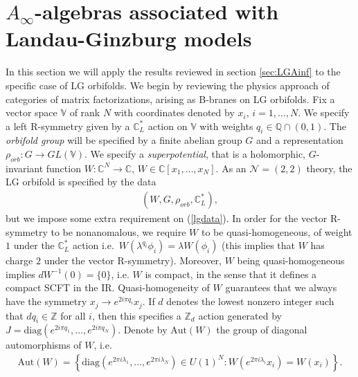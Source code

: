 \documentclass[a4paper,11pt]{article}
\newcommand{\Af}{{A_\infty}}
\numberwithin{equation}{section}
\begin{document}
\section{$\Af$-algebras associated with Landau-Ginzburg 
models}\label{sec:AinfLG}

In this section we will apply the results reviewed in section \ref{sec:LGAinf} 
to the specific case of LG orbifolds. We begin by reviewing the physics 
approach of categories of matrix factorizations, arising as B-branes on LG 
orbifolds. Fix a vector 
space $\mathbb{V}$ of rank $N$ with coordinates denoted by $x_{i}$, 
$i=1,\ldots,N$. We specify a left R-symmetry given by a $\mathbb{C}^{*}_{L}$ 
action on $\mathbb{V}$ with weights $q_{i}\in\mathbb{Q}\cap (0,1)$. The 
\emph{orbifold group} will be specified by a finite abelian group $G$ and a 
representation $\rho_{orb}:G\rightarrow GL(\mathbb{V})$. We specify a 
\emph{superpotential}, that is a holomorphic, $G$-invariant function 
$W:\mathbb{C}^{N}\rightarrow \mathbb{C}$, $W\in 
\mathbb{C}[x_{1},\ldots,x_{N}]$. As an $\mathcal{N}=(2,2)$ theory, the 
LG orbifold is specified by the data
\begin{eqnarray}
  \label{lgdata}
(W,G,\rho_{orb},\mathbb{C}^{*}_{L}),
\end{eqnarray}
but we impose some extra requirement on (\ref{lgdata}). In order for 
the vector R-symmetry to be nonanomalous, we require $W$ to 
be quasi-homogeneous, of weight $1$ under the $\mathbb{C}^{*}_{L}$ action
i.e.~$W(\lambda^{q_{i}}\phi_{i})=\lambda W(\phi_{i})$ \cite{Vafa:1988uu} (this 
implies that $W$ has charge $2$ under the vector R-symmetry). Moreover, $W$ 
being quasi-homogeneous implies $dW^{-1}(0)=\{ 0\}$, i.e. $W$ is compact, in 
the 
sense that it defines a compact SCFT in the IR. Quasi-homogeneity of $W$ 
guarantees that we always have the symmetry $x_{j}\rightarrow e^{ 2 
i\pi q_{i}}x_{j}$. If $d$ denotes the lowest nonzero integer such that 
$dq_{i}\in \mathbb{Z}$ for all $i$, then this specifies a $\mathbb{Z}_{d}$ 
action generated by $J=\mathrm{diag}(e^{ 2i\pi 
q_{1}},\ldots,e^{ 2i\pi q_{N}})$. Denote by $\mathrm{Aut}(W)$ the group of 
diagonal automorphisms of $W$, i.e.
\begin{eqnarray}
\mathrm{Aut}(W)=\left\{ \mathrm{diag}(e^{ 2\pi i \lambda_{1}},\ldots,e^{ 2\pi i 
\lambda_{N}})\in U(1)^{N}:W(e^{2\pi i\lambda_{i}}x_{i})=W(x_{i})  
\right\}.
\end{eqnarray}
\end{document}
